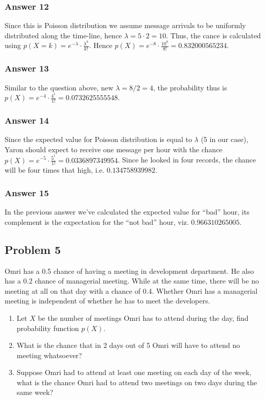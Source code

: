 \documentclass[11pt]{article}
\begin{document}
\subsubsection{Answer 12}
\label{sec:orgheadline15}
Since this is Poisson distribution we assume message arrivals to be uniformly
distributed along the time-line, hence \(\lambda = 5 \cdot 2 = 10\).  Thus, the
cance is calculated using \(p(X = k) = e^{-\lambda} \cdot \frac{\lambda^k}{k!}\).
Hence \(p(X) = e^{-8} \cdot \frac{10^8}{8!} = \num{0.832000565234}\).

\subsubsection{Answer 13}
\label{sec:orgheadline16}
Similar to the question above, new \(\lambda = 8 / 2 = 4\), the probability thus
is \(p(X) = e^{-4} \cdot \frac{4^1}{1!} = \num{0.0732625555548}\).

\subsubsection{Answer 14}
\label{sec:orgheadline17}
Since the expected value for Poisson distribution is equal to \(\lambda\) (5
in our case), Yaron should expect to receive one message per hour with the
chance \(p(X) = e^{-5} \cdot \frac{5^1}{1!} = \num{0.0336897349954}\).  Since
he looked in four records, the chance will be four times that high, i.e.
\(\num{0.134758939982}\).

\subsubsection{Answer 15}
\label{sec:orgheadline18}
In the previous answer we've calculated the expected value for ``bad'' hour,
its complement is the expectation for the ``not bad'' hour,
viz. \(\num{0.966310265005}\).

\subsection{Problem 5}
\label{sec:orgheadline23}
Omri has a 0.5 chance of having a meeting in development department.  He also
has a 0.2 chance of managerial meeting.  While at the same time, there will
be no meeting at all on that day with a chance of 0.4.  Whether Omri has a
managerial meeting is independent of whether he has to meet the developers.
\begin{enumerate}
\item Let \(X\) be the number of meetings Omri has to attend during the day,
find probability function \(p(X)\).
\item What is the chance that in 2 days out of 5 Omri will have to attend no
meeting whatsoever?
\item Suppose Omri had to attend at least one meeting on each day of the week,
what is the chance Omri had to attend two meetings on two days during
the same week?
\end{enumerate}
\end{document}
